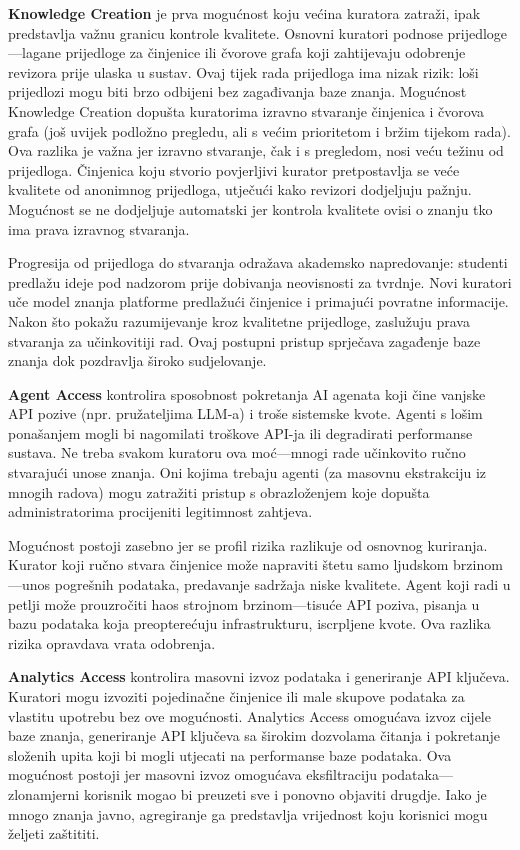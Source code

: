 \documentclass[12pt,a4paper]{article}
\begin{document}
\textbf{Knowledge Creation} je prva mogućnost koju većina kuratora zatraži, ipak predstavlja važnu granicu kontrole kvalitete. Osnovni kuratori podnose prijedloge—lagane prijedloge za činjenice ili čvorove grafa koji zahtijevaju odobrenje revizora prije ulaska u sustav. Ovaj tijek rada prijedloga ima nizak rizik: loši prijedlozi mogu biti brzo odbijeni bez zagađivanja baze znanja. Mogućnost Knowledge Creation dopušta kuratorima izravno stvaranje činjenica i čvorova grafa (još uvijek podložno pregledu, ali s većim prioritetom i bržim tijekom rada). Ova razlika je važna jer izravno stvaranje, čak i s pregledom, nosi veću težinu od prijedloga. Činjenica koju stvorio povjerljivi kurator pretpostavlja se veće kvalitete od anonimnog prijedloga, utječući kako revizori dodjeljuju pažnju. Mogućnost se ne dodjeljuje automatski jer kontrola kvalitete ovisi o znanju tko ima prava izravnog stvaranja.

Progresija od prijedloga do stvaranja odražava akademsko napredovanje: studenti predlažu ideje pod nadzorom prije dobivanja neovisnosti za tvrdnje. Novi kuratori uče model znanja platforme predlažući činjenice i primajući povratne informacije. Nakon što pokažu razumijevanje kroz kvalitetne prijedloge, zaslužuju prava stvaranja za učinkovitiji rad. Ovaj postupni pristup sprječava zagađenje baze znanja dok pozdravlja široko sudjelovanje.

\textbf{Agent Access} kontrolira sposobnost pokretanja AI agenata koji čine vanjske API pozive (npr. pružateljima LLM-a) i troše sistemske kvote. Agenti s lošim ponašanjem mogli bi nagomilati troškove API-ja ili degradirati performanse sustava. Ne treba svakom kuratoru ova moć—mnogi rade učinkovito ručno stvarajući unose znanja. Oni kojima trebaju agenti (za masovnu ekstrakciju iz mnogih radova) mogu zatražiti pristup s obrazloženjem koje dopušta administratorima procijeniti legitimnost zahtjeva.

Mogućnost postoji zasebno jer se profil rizika razlikuje od osnovnog kuriranja. Kurator koji ručno stvara činjenice može napraviti štetu samo ljudskom brzinom—unos pogrešnih podataka, predavanje sadržaja niske kvalitete. Agent koji radi u petlji može prouzročiti haos strojnom brzinom—tisuće API poziva, pisanja u bazu podataka koja preopterećuju infrastrukturu, iscrpljene kvote. Ova razlika rizika opravdava vrata odobrenja.

\textbf{Analytics Access} kontrolira masovni izvoz podataka i generiranje API ključeva. Kuratori mogu izvoziti pojedinačne činjenice ili male skupove podataka za vlastitu upotrebu bez ove mogućnosti. Analytics Access omogućava izvoz cijele baze znanja, generiranje API ključeva sa širokim dozvolama čitanja i pokretanje složenih upita koji bi mogli utjecati na performanse baze podataka. Ova mogućnost postoji jer masovni izvoz omogućava eksfiltraciju podataka—zlonamjerni korisnik mogao bi preuzeti sve i ponovno objaviti drugdje. Iako je mnogo znanja javno, agregiranje ga predstavlja vrijednost koju korisnici mogu željeti zaštititi.
\end{document}
